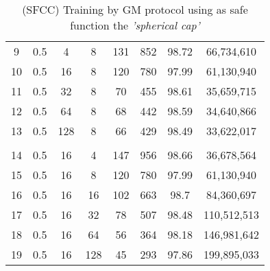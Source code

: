 \begin{table}[H]
\begin{tabular}{|c|c|c|c|c|c|c|c|}
        9                      & 0.5                   & 4                     & 8                     & 131                   & 852                   & 98.72                 & 66,734,610               \\
        10                     & 0.5                   & 16                    & 8                     & 120                   & 780                   & 97.99                 & 61,130,940               \\
        11                     & 0.5                   & 32                    & 8                     & 70                    & 455                   & 98.61                 & 35,659,715               \\
        12                     & 0.5                   & 64                    & 8                     & 68                    & 442                   & 98.59                 & 34,640,866               \\
        13                     & 0.5                   & 128                   & 8                     & 66                    & 429                   & 98.49                 & 33,622,017               \\
        \hline
        \multicolumn{1}{|l|}{} & \multicolumn{1}{l|}{} & \multicolumn{1}{l|}{} & \multicolumn{1}{l|}{} & \multicolumn{1}{l|}{} & \multicolumn{1}{l|}{} & \multicolumn{1}{l|}{} & \multicolumn{1}{l|}{}    \\
        \hline
        14                     & 0.5                   & 16                    & 4                     & 147                   & 956                   & 98.66                 & 36,678,564               \\
        15                     & 0.5                   & 16                    & 8                     & 120                   & 780                   & 97.99                 & 61,130,940               \\
        16                     & 0.5                   & 16                    & 16                    & 102                   & 663                   & 98.7                  & 84,360,697               \\
        17                     & 0.5                   & 16                    & 32                    & 78                    & 507                   & 98.48                 & 110,512,513              \\
        18                     & 0.5                   & 16                    & 64                    & 56                    & 364                   & 98.18                 & 146,981,642              \\
        19                     & 0.5                   & 16                    & 128                   & 45                    & 293                   & 97.86                 & 199,895,033              \\
        \hline
    \end{tabular}
    \caption{(SFCC) Training by GM protocol using as safe function the \emph{'spherical cap'}}
    \label{tab:table-gm-sf2-class-exp}
\end{table}

